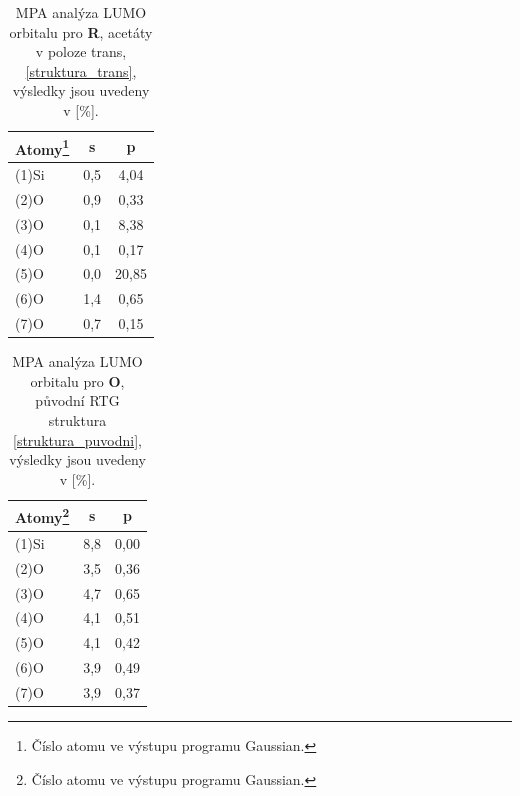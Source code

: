\documentclass[
  digital, %
  table,   %
  lof,     %
  lot,     %
  oneside,
]{fithesis3}
\begin{document}
\begin{table}[htbp]\begin{minipage}{\textwidth}
\caption{MPA analýza LUMO orbitalu pro \textbf{R}, acetáty v poloze trans, \ref{struktura_trans}, výsledky jsou uvedeny v [\%]. }
\begin{center}
\begin{tabular}{|l|c|c|}
\hline
 \label{struktura_C_trans_MPA}Atomy\footnote{Číslo atomu ve výstupu programu Gaussian.}& s &p \\ \hline
(1)Si & 0,5  & 4,04   \\ \hline
(2)O & 0,9  & 0,33   \\ \hline
(3)O & 0,1  & 8,38   \\ \hline
(4)O & 0,1  & 0,17   \\ \hline
(5)O & 0,0  & 20,85   \\ \hline
(6)O & 1,4  & 0,65   \\ \hline
(7)O & 0,7  & 0,15   \\ \hline
\end{tabular}
\end{center}\end{minipage}
\end{table}

\begin{table}[htbp]\begin{minipage}{\textwidth}
\caption{MPA analýza LUMO orbitalu pro \textbf{O}, původní RTG struktura \ref{struktura_puvodni}, výsledky jsou uvedeny v [\%].}
\begin{center}
\begin{tabular}{|l|c|c|}
\hline
 \label{struktura_puvodni_MPA}Atomy\footnote{Číslo atomu ve výstupu programu Gaussian.}& s & p\\ \hline
(1)Si & 8,8  & 0,00   \\ \hline
(2)O & 3,5  & 0,36   \\ \hline
(3)O & 4,7  & 0,65   \\ \hline
(4)O & 4,1  & 0,51   \\ \hline
(5)O & 4,1  & 0,42   \\ \hline
(6)O & 3,9  & 0,49   \\ \hline
(7)O & 3,9  & 0,37   \\ \hline
\end{tabular}
\end{center}\end{minipage}
\end{table}
\end{document}
